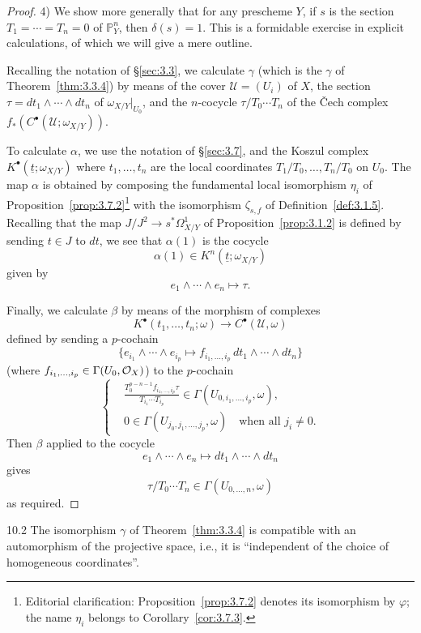 \begin{proof}
4) We show more generally that for any prescheme $Y$, if $s$ is the section $T_1=\cdots=T_n=0$ of $\mathbb{P}_Y^n$, then $\delta(s)=1$. This is a formidable exercise in explicit calculations, of which we will give a mere outline.

Recalling the notation of \S\ref{sec:3.3}, we calculate $\gamma$ (which is the $\gamma$ of Theorem~\ref{thm:3.3.4}) by means of the cover $\mathcal{U}=(U_i)$ of $X$, the section $\tau=dt_1\wedge\cdots\wedge dt_n$ of $\omega_{X/Y}|_{U_0}$, and the $n$-cocycle $\tau/T_0\cdots T_n$ of the \v{C}ech complex $f_*(C^\bullet(\mathcal{U};\omega_{X/Y}))$.

To calculate $\alpha$, we use the notation of \S\ref{sec:3.7}, and the Koszul complex $K^\bullet(\underline{t};\omega_{X/Y})$ where $t_1,\dots,t_n$ are the local coordinates $T_1/T_0,\dots,T_n/T_0$ on $U_0$. The map $\alpha$ is obtained by composing the fundamental local isomorphism $\eta_i$ of Proposition~\ref{prop:3.7.2}\footnote{Editorial clarification: Proposition~\ref{prop:3.7.2} denotes its isomorphism by $\varphi$; the name $\eta_i$ belongs to Corollary~\ref{cor:3.7.3}.} with the isomorphism $\zeta_{s,f}$ of Definition~\ref{def:3.1.5}. Recalling that the map $J/J^2\to s^*\Omega^1_{X/Y}$ of Proposition~\ref{prop:3.1.2} is defined by sending $t\in J$ to $dt$, we see that $\alpha(1)$ is the cocycle
\[
\alpha(1) \in K^n(\underline{t}; \omega_{X/Y})
\]
given by
\[
e_1\wedge\cdots\wedge e_n \longmapsto \tau.
\]

Finally, we calculate $\beta$ by means of the morphism of complexes
\[
K^\bullet(t_1,\dots,t_n;\omega) \longrightarrow C^\bullet(\mathcal{U},\omega)
\]
defined by sending a $p$-cochain
\[
\bigl\{e_{i_1}\wedge\cdots\wedge e_{i_p} \longmapsto f_{i_1,\dots,i_p}\,dt_1\wedge\cdots\wedge dt_n\bigr\}
\]
(where $f_{i_1,\dots,i_p}\in\Gamma(U_0,\mathcal{O}_X)$) to the $p$-cochain
\[
\left\{\begin{aligned}
&\frac{T_0^{p-n-1}f_{i_1,\dots,i_p}\tau}{T_{i_1}\cdots T_{i_p}}
  \in \Gamma(U_{0,i_1,\dots,i_p},\omega),\\
&0\in\Gamma(U_{j_0,j_1,\dots,j_p},\omega)
  \quad\text{when all }j_i\neq 0.
\end{aligned}\right.
\]
Then $\beta$ applied to the cocycle
\[
e_1\wedge\cdots\wedge e_n \longmapsto dt_1\wedge\cdots\wedge dt_n
\]
gives
\[
\tau/T_0\cdots T_n \in \Gamma(U_{0,\dots,n},\omega)
\]
as required.
\end{proof}

\begin{bookcorollary}{10.2}\label{cor:3.10.2}
The isomorphism $\gamma$ of Theorem~\ref{thm:3.3.4} is compatible with an automorphism of the projective space, i.e., it is ``independent of the choice of homogeneous coordinates''.
\end{bookcorollary}

